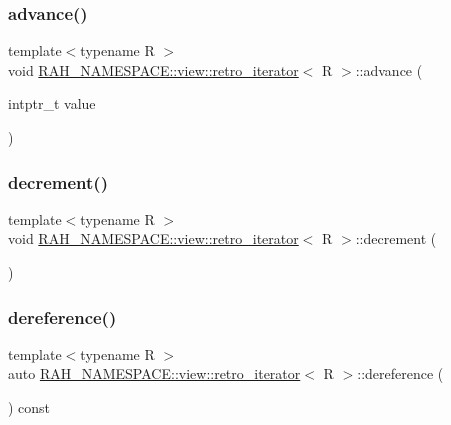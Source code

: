 \subsubsection{\texorpdfstring{advance()}{advance()}}
{\footnotesize\ttfamily template$<$typename R $>$ \\
void \mbox{\hyperlink{struct_r_a_h___n_a_m_e_s_p_a_c_e_1_1view_1_1retro__iterator}{R\+A\+H\+\_\+\+N\+A\+M\+E\+S\+P\+A\+C\+E\+::view\+::retro\+\_\+iterator}}$<$ R $>$\+::advance (\begin{DoxyParamCaption}\item[{intptr\+\_\+t}]{value }\end{DoxyParamCaption})\hspace{0.3cm}{\ttfamily [inline]}}

\mbox{\label{struct_r_a_h___n_a_m_e_s_p_a_c_e_1_1view_1_1retro__iterator_acc9b3287cf662c34313077a70594ad95}} 
\subsubsection{\texorpdfstring{decrement()}{decrement()}}
{\footnotesize\ttfamily template$<$typename R $>$ \\
void \mbox{\hyperlink{struct_r_a_h___n_a_m_e_s_p_a_c_e_1_1view_1_1retro__iterator}{R\+A\+H\+\_\+\+N\+A\+M\+E\+S\+P\+A\+C\+E\+::view\+::retro\+\_\+iterator}}$<$ R $>$\+::decrement (\begin{DoxyParamCaption}{ }\end{DoxyParamCaption})\hspace{0.3cm}{\ttfamily [inline]}}

\mbox{\label{struct_r_a_h___n_a_m_e_s_p_a_c_e_1_1view_1_1retro__iterator_a1e188574ae18f045816f0181224bcc36}} 
\subsubsection{\texorpdfstring{dereference()}{dereference()}}
{\footnotesize\ttfamily template$<$typename R $>$ \\
auto \mbox{\hyperlink{struct_r_a_h___n_a_m_e_s_p_a_c_e_1_1view_1_1retro__iterator}{R\+A\+H\+\_\+\+N\+A\+M\+E\+S\+P\+A\+C\+E\+::view\+::retro\+\_\+iterator}}$<$ R $>$\+::dereference (\begin{DoxyParamCaption}{ }\end{DoxyParamCaption}) const\hspace{0.3cm}{\ttfamily [inline]}}

